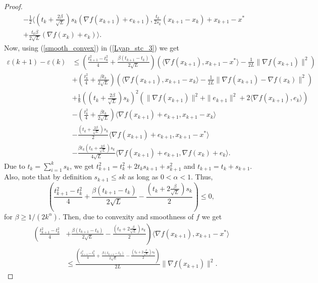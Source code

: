 \documentclass{article}
\theoremstyle{plain}
\theoremstyle{definition}
\theoremstyle{remark}
\begin{document}
\begin{proof}
\begin{align}
        &-\frac{1}{2}\langle (t_k+\frac{2\beta}{\sqrt{L}})s_k (\nabla f(x_{k+1})+e_{k+1}), \frac{t_k}{2s_k}(x_{k+1}-x_k)+x_{k+1}-x^*\nonumber\\
        &+\frac{t_k\beta}{2\sqrt{L}}(\nabla f(x_k)+e_k)\rangle.
    \end{align}
    Now, using (\ref{smooth_convex}) in (\ref{Lyap_stc_3}) we get
    \begin{align}\label{Lyap2_stc_4}
         \varepsilon(k+1)-\varepsilon(k)&\leq (\frac{t_{k+1}^2-t_k^2}{4}+\frac{\beta(t_{k+1}-t_k)}{2\sqrt{L}})(\langle \nabla f(x_{k+1}),x_{k+1}-x^* \rangle-\frac{1}{2L}\|\nabla f(x_{k+1})\|^2)\nonumber\\
         & +(\frac{t_{k}^2}{4}+\frac{\beta t_{k}}{2\sqrt{L}})(\langle \nabla f(x_{k+1}),x_{k+1}-x_k \rangle-\frac{1}{2L}\|\nabla f(x_{k+1})-\nabla f(x_k)\|^2)\nonumber\\
         & +\frac{1}{8}((t_k+\frac{2\beta}{\sqrt{L}})s_k)^2(\|\nabla f(x_{k+1})\|^2+\|e_{k+1}\|^2+2\langle \nabla f(x_{k+1}) ,e_k \rangle) \nonumber\\
         & -(\frac{t_k^2}{4}+\frac{\beta t_k}{2\sqrt{L}})\langle \nabla f(x_{k+1})+e_{k+1},x_{k+1}-x_k\rangle\nonumber\\
         &-\frac{(t_k+\tfrac{2\beta}{\sqrt{L}})s_k}{2}\langle \nabla f(x_{k+1})+e_{k+1},x_{k+1}-x^*\rangle\nonumber\\
         & -\frac{\beta t_k(t_k+\frac{2\beta}{\sqrt{L}})s_k}{4\sqrt{L}}\langle \nabla f(x_{k+1})+e_{k+1}, \nabla f(x_k)+e_k \rangle.
         \end{align}
          Due to $t_k=\sum_{i=1}^k s_k$, we get $t_{k+1}^2=t_k^2 + 2t_ks_{k+1}+ s_{k+1}^2$ and $t_{k+1}=t_k+s_{k+1}$. Also, note  that by definition $s_{k+1}\leq s{k}$ as long as $0<\alpha<1$. Thus,
         $$\left(\frac{t_{k+1}^2-t_k^2}{4}+\frac{\beta (t_{k+1}-t_k)}{2\sqrt{L}} -\frac{(t_k+2\frac{\beta}{\sqrt{L}})s_k}{2}\right)\leq 0,$$
         for $\beta \geq 1/(2k^\alpha)$.
         Then, due to convexity and smoothness of $f$ we get
         \begin{align}\label{Lyap2_stc_5}
             \left(\frac{t_{k+1}^2-t_k^2}{4}\right. & \left. +\frac{\beta (t_{k+1}-t_k)}{2\sqrt{L}} -\frac{(t_k+2\frac{\beta}{\sqrt{L}})s_k}{2}\right)\langle \nabla f(x_{k+1}), x_{k+1}-x^* \rangle\nonumber\\
             &\leq \frac{\left(\frac{t_{k+1}^2-t_k^2}{4}+\frac{\beta (t_{k+1}-t_k)}{2\sqrt{L}} -\frac{(t_k+2\frac{\beta}{\sqrt{L}})s_k}{2}\right)}{2L}\|\nabla f(x_{k+1})\|^2.
         \end{align} 

\end{proof}
\end{document}
